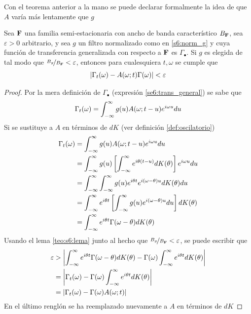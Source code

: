 Con el teorema anterior a la mano se puede declarar formalmente la idea de que $A$ varía más lentamente que $g$

\begin{teorema}
Sea $\mathbf{F}$ una familia semi-estacionaria con ancho de banda característico $B_{\mathbf{F}}$, sea $\varepsilon >0$ arbitrario, y sea $g$ un filtro normalizado como en \ref{s6:norm_g} y cuya función de transferencia generalizada con respecto a $\mathbf{F}$ es $\Gamma_\bullet$. 
%
Si $g$ es elegida de tal modo que $\nicefrac{B_g}{B_{\mathbf{F}}} < \varepsilon$, entonces para cualesquiera $t, \omega$ se cumple que
\begin{equation}
\left| \Gamma_t(\omega)- A(\omega; t)\Gamma(\omega) \right| < \varepsilon
\end{equation}
\label{teo:aprox_gamma} 
\end{teorema}

\begin{proof}
Por la mera definición de $\Gamma_\bullet$ (expresión \ref{se6:trans_general}) se sabe que
\begin{equation*}
\Gamma_t (\omega) = \int_{-\infty}^{\infty} g(u) A(\omega; t-u) e^{i \omega u} du
\end{equation*}
Si se sustituye a $A$ en términos de $dK$ (ver definición \ref{def:oscilatorio})
\begin{align*}
\Gamma_t (\omega) &= \int_{-\infty}^{\infty} g(u) A(\omega; t-u) e^{i \omega u} du \\
&= 
\int_{-\infty}^{\infty} g(u) \left[ \int_{-\infty}^{\infty} e^{i \theta (t-u)} dK(\theta) \right] e^{i \omega u} du \\
&=
\int_{-\infty}^{\infty} \int_{-\infty}^{\infty} g(u) e^{i \theta t} e^{i (\omega- \theta) u} dK(\theta) du \\
&=
\int_{-\infty}^{\infty} e^{i \theta t} \left[ \int_{-\infty}^{\infty} g(u) e^{i (\omega- \theta) u} du \right] dK(\theta) \\
&=
\int_{-\infty}^{\infty} e^{i \theta t} \Gamma(\omega - \theta) dK(\theta) \\
\end{align*}
Usando el lema \ref{teo:s6:lema} junto al hecho que $\nicefrac{B_g}{B_{\mathbf{F}}} < \varepsilon$, se puede escribir que
\begin{align*}
\varepsilon 
&> 
\left| \int_{-\infty}^{\infty} e^{i \theta t} \Gamma(\omega - \theta) dK(\theta) - 
\Gamma(\omega) \int_{-\infty}^{\infty} e^{i \theta t} dK(\theta)  \right| \\
&=
\left| \Gamma_t (\omega) - 
\Gamma(\omega) \int_{-\infty}^{\infty} e^{i \theta t} dK(\theta)  \right| \\
&=
\left| \Gamma_t (\omega) - 
\Gamma(\omega) A(\omega; t)  \right|
\end{align*}
En el último renglón se ha reemplazado nuevamente a $A$ en términos de $dK	$
\end{proof}

